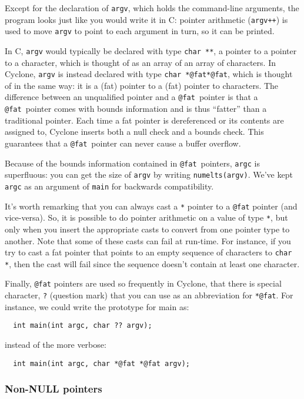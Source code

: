 Except for the declaration of \texttt{argv}, which holds the
command-line arguments, the program looks just like you would write it
in C: pointer arithmetic (\texttt{argv++}) is used to move
\texttt{argv} to point to each argument in turn, so it can be printed.

In C, \texttt{argv} would typically be declared with type \texttt{char
  **}, a pointer to a pointer to a character, which is thought of as
an array of an array of characters.  In Cyclone, \texttt{argv} is
instead declared with type \texttt{char *@fat*@fat}, which is thought of in
the same way: it is a (fat) pointer to a (fat) pointer to characters.  The
difference between an unqualified pointer and a \texttt{@fat}\ pointer is
that a \texttt{@fat}\ pointer comes with bounds information and is thus
``fatter'' than a traditional pointer.  Each time a
fat pointer is dereferenced or its contents are assigned to,
Cyclone inserts both a null check and a bounds check.  This
guarantees that a \texttt{@fat}\ pointer can never cause a buffer
overflow.

Because of the bounds information contained in \texttt{@fat}\ pointers,
\texttt{argc} is superfluous: you can get the size of \texttt{argv} by
writing \texttt{numelts(argv)}.  We've kept \texttt{argc} as an argument
of \texttt{main} for backwards compatibility.

It's worth remarking that you can always cast a \texttt{*} pointer
to a \texttt{@fat} pointer (and vice-versa).  So, it is possible to do
pointer arithmetic on a value of type \texttt{*}, but only when you
insert the appropriate casts to convert from one pointer type to 
another.  Note that some of these casts can fail at run-time.  For
instance, if you try to cast a fat pointer that points to an empty 
sequence of characters to \texttt{char *}, then the cast will fail
since the sequence doesn't contain at least one character. 

Finally, \texttt{@fat} pointers are used so frequently in Cyclone,
that there is special character, \texttt{?} (question mark) that you 
can use as an abbreviation for \texttt{*@fat}.  For instance, we could
write the prototype for main as:
\begin{verbatim}
  int main(int argc, char ?? argv);
\end{verbatim}
instead of the more verbose:
\begin{verbatim}
  int main(int argc, char *@fat *@fat argv);
\end{verbatim}

\subsubsection*{Non-NULL pointers}


